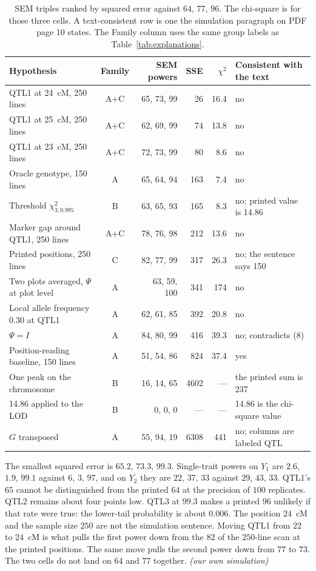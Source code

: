 \documentclass[11pt]{article}
\newcommand{\ev}[1]{\textup{\emph{(#1)}}}
\begin{document}
\begin{table}[ht]
\centering
\scriptsize
\caption{SEM triples ranked by squared error against $64$, $77$, $96$.
The chi-square is for those three cells. A text-consistent row is one the
simulation paragraph on PDF page 10 states. The Family column uses the
same group labels as Table~\ref{tab:explanations}.}
\label{tab:qtl1}
\begin{tabular}{p{4.4cm}crrr p{3.2cm}}
\hline
Hypothesis & Family & SEM powers & SSE & $\chi^2$ & Consistent with the text \\
\hline
QTL1 at 24~cM, 250 lines & A+C & 65, 73, 99 & 26 & 16.4 & no \\
QTL1 at 25~cM, 250 lines & A+C & 62, 69, 99 & 74 & 13.8 & no \\
QTL1 at 23~cM, 250 lines & A+C & 72, 73, 99 & 80 & 8.6 & no \\
Oracle genotype, 150 lines & A & 65, 64, 94 & 163 & 7.4 & no \\
Threshold $\chi^2_{3,0.995}$ & B & 63, 65, 93 & 165 & 8.3 & no; printed value is 14.86 \\
Marker gap around QTL1, 250 lines & A+C & 78, 76, 98 & 212 & 13.6 & no \\
Printed positions, 250 lines & C & 82, 77, 99 & 317 & 26.3 & no; the sentence says 150 \\
Two plots averaged, $\Psi$ at plot level & A & 63, 59, 100 & 341 & 174 & no \\
Local allele frequency 0.30 at QTL1 & A & 62, 61, 85 & 392 & 20.8 & no \\
$\Psi=I$ & A & 84, 80, 99 & 416 & 39.3 & no; contradicts (8) \\
Position-reading baseline, 150 lines & A & 51, 54, 86 & 824 & 37.4 & yes \\
One peak on the chromosome & B & 16, 14, 65 & 4602 & --- & the printed sum is 237 \\
14.86 applied to the LOD & B & 0, 0, 0 & --- & --- & 14.86 is the chi-square value \\
$G$ transposed & A & 55, 94, 19 & 6308 & 441 & no; columns are labeled QTL \\
\hline
\end{tabular}
\end{table}

The smallest squared error is $65.2$, $73.3$, $99.3$. Single-trait powers on
$Y_1$ are $2.6$, $1.9$, $99.1$ against $6$, $3$, $97$, and on $Y_2$ they are
$22$, $37$, $33$ against $29$, $43$, $33$. QTL1's $65$ cannot be
distinguished from the printed $64$ at the precision of $100$ replicates.
QTL2 remains about four points low. QTL3 at $99.3$ makes a printed $96$
unlikely if that rate were true: the lower-tail probability is about
$0.006$. The position $24$~cM and the sample size $250$ are not the
simulation sentence. Moving QTL1 from $22$ to $24$~cM is what pulls the
first power down from the $82$ of the $250$-line scan at the printed
positions. The same move pulls the second power down from $77$ to $73$.
The two cells do not land on $64$ and $77$ together.
\ev{our own simulation}
\end{document}
